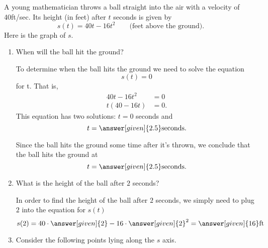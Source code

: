 \documentclass{ximera}
\begin{document}
\begin{example}
A young mathematician throws a ball straight into the air with 
a velocity of 40ft/sec. Its height (in feet) after $t$ seconds 
is given by
\[
s(t) = 40t-16t^2 \qquad\text{(feet above the ground)} .
\]
Here is the graph of $s$.
\begin{image}
\end{image}
\begin{enumerate}
\item When will the ball hit the ground? 

\begin{explanation}
To determine when the ball hits the ground we need to solve the
equation
\[
s(t)=0
\]
for t.  That is,
\begin{align*}
40t-16t^2 &= 0\\
t(40-16t) &= 0.
\end{align*}
This  equation has two solutions: $t=0$
seconds and
 \[
 t=\answer[given]{2.5} \text{seconds}.
 \] 
 
   Since the ball hits
the ground  some time after it's
thrown, we conclude that the ball hits the ground at 
\[
t=\answer[given]{2.5}\text{seconds}.
\]
\end{explanation}


\item What is the height of the ball after $2$ seconds?

\begin{explanation}
In order to find the height of the ball after $2$ seconds, we simply need 
to plug $2$ into the equation for $s(t)$ 
\[
s(2) = 40\cdot\answer[given]{2} - 16\cdot\answer[given]{2}^2 = 
\answer[given]{16}\text{ft}
\]

\end{explanation}
\item Consider the following points lying along the $s$ axis.
\begin{image}
\end{image}
\end{enumerate}
\end{example}
\end{document}
